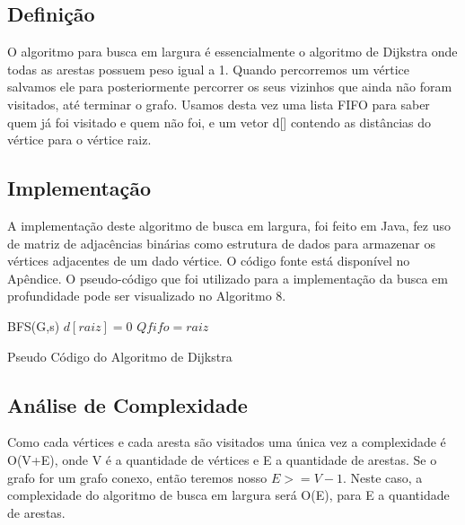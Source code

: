 \documentclass[a4paper,12pt]{article}
\begin{document}
\subsection{Definição}
O algoritmo para busca em largura é essencialmente o algoritmo de Dijkstra onde todas as arestas possuem peso igual a 1. Quando percorremos um vértice salvamos ele para posteriormente percorrer os seus vizinhos que ainda não foram visitados, até terminar o grafo. Usamos desta vez uma lista FIFO para saber quem já foi visitado e quem não foi, e um vetor d[] contendo as distâncias do vértice para o vértice raiz.

\subsection{Implementação}
A implementação deste algoritmo de busca em largura, foi feito em Java, fez uso de matriz de adjacências binárias como estrutura de dados para armazenar os vértices adjacentes de um dado vértice. O código fonte está disponível no Apêndice. O pseudo-código que foi utilizado para a implementação da busca em profundidade pode ser visualizado no Algoritmo 8. 

\begin{algorithm}[H]
\LinesNumbered
\SetAlgoLined
{}
BFS(G,s)\;
$ d[raiz] = 0$\;
$ Qfifo = {raiz}$\;

\caption{Pseudo Código do Algoritmo de Dijkstra}
\end{algorithm}

\subsection{Análise de Complexidade}
Como cada vértices e cada aresta são visitados uma única vez a complexidade é O(V+E), onde V é a quantidade de vértices e E a quantidade de arestas. Se o grafo for um grafo conexo, então teremos nosso \emph{$E >= V-1$}. Neste caso, a complexidade do algoritmo de busca em largura será O(E), para E a quantidade de arestas.
\end{document}
